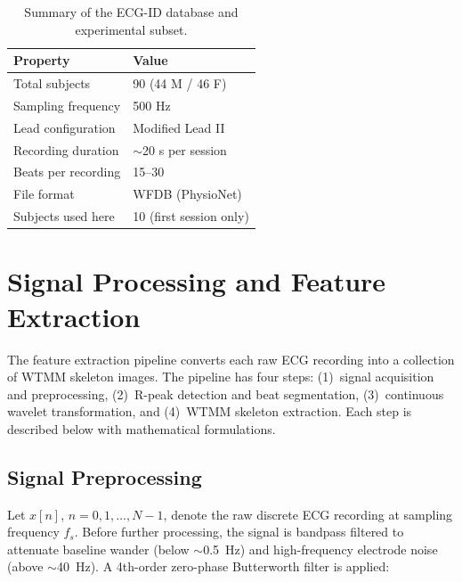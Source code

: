 \documentclass[12pt, a4paper]{article}
\begin{document}
\begin{table}[H]
  \centering
  \caption{Summary of the ECG-ID database and experimental subset.}
  \label{tab:dataset}
  \begin{tabularx}{0.75\textwidth}{lX}
    \toprule
    \textbf{Property} & \textbf{Value} \\
    \midrule
    Total subjects         & 90 (44 M / 46 F) \\
    Sampling frequency     & 500 Hz \\
    Lead configuration     & Modified Lead II \\
    Recording duration     & $\sim$20 s per session \\
    Beats per recording    & 15--30 \\
    File format            & WFDB (PhysioNet) \\
    Subjects used here     & 10 (first session only) \\
    \bottomrule
  \end{tabularx}
\end{table}

\section{Signal Processing and Feature Extraction}
\label{sec:methods}

The feature extraction pipeline converts each raw ECG recording into a
collection of WTMM skeleton images. The pipeline has four steps:
(1)~signal acquisition and preprocessing,
(2)~R-peak detection and beat segmentation,
(3)~continuous wavelet transformation,
and (4)~WTMM skeleton extraction.
Each step is described below with mathematical formulations.

\subsection{Signal Preprocessing}

Let $x[n]$, $n = 0, 1, \dots, N-1$, denote the raw discrete ECG recording
at sampling frequency $f_s$.
Before further processing, the signal is bandpass filtered to attenuate
baseline wander (below $\sim$0.5~Hz) and high-frequency electrode noise
(above $\sim$40~Hz).
A 4th-order zero-phase Butterworth filter is applied:
\end{document}
